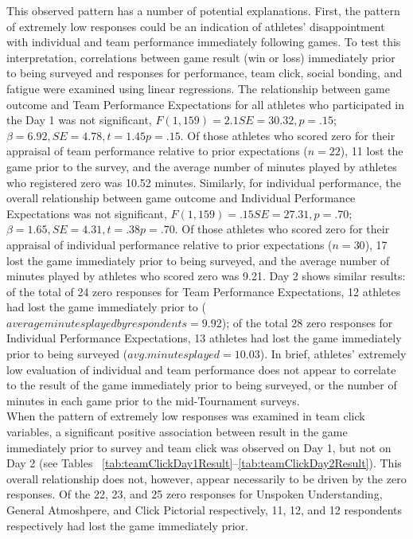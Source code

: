 \documentclass[12pt]{report}
\begin{document}
{This observed pattern has a number of potential explanations. First, the pattern of extremely low responses could be an indication of athletes’ disappointment with individual and team performance immediately following games. To test this interpretation, correlations between game result (win or loss) immediately prior to being surveyed and responses for performance, team click, social bonding, and fatigue were examined using linear regressions.  The relationship between game outcome and Team Performance Expectations for all athletes who participated in the Day 1 was not significant, $F(1,159) = 2.1 SE = 30.32, p = .15$; $\beta = 6.92, SE = 4.78, t = 1.45 p = .15.$  Of those athletes who scored zero for their appraisal of team performance relative to prior expectations ($n = 22$), 11 lost the game prior to the survey, and the average number of minutes played by athletes who registered zero was 10.52 minutes. Similarly, for individual performance, the overall relationship between game outcome and Individual Performance Expectations was not significant, $F(1,159) = .15 SE = 27.31, p = .70$; $\beta = 1.65, SE = 4.31, t = .38 p = .70$.  Of those athletes who scored zero for their appraisal of individual performance relative to prior expectations ($n = 30$), 17 lost the game immediately prior to being surveyed, and the average number of minutes played by athletes who scored zero was 9.21. Day 2 shows similar results: of the total of 24 zero responses for Team Performance Expectations, 12 athletes had lost the game immediately prior to ($average minutes played by respondents = 9.92$); of the total 28 zero responses for Individual Performance Expectations, 13 athletes had lost the game immediately prior to being surveyed ($avg. minutes played = 10.03$).  In brief, athletes' extremely low evaluation of individual and team performance does not appear to correlate to the result of the game immediately prior to being surveyed, or the number of minutes in each game prior to the mid-Tournament surveys. \\


When the pattern of extremely low responses was examined in team click variables, a significant positive association between result in the game immediately prior to survey and team click was observed on Day 1, but not on Day 2 (see Tables ~\ref{tab:teamClickDay1Result}\nobreakdash--\ref{tab:teamClickDay2Result}). This overall relationship does not, however, appear necessarily to be driven by the zero responses.  Of the 22, 23, and 25 zero responses for Unspoken Understanding, General Atmoshpere, and Click Pictorial respectively, 11, 12, and 12 respondents respectively had lost the game immediately prior.

}
\end{document}

